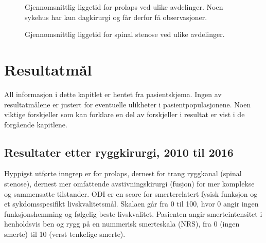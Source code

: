 \begin{figure}[h] 
\caption{Gjennomsnittlig liggetid for prolaps ved ulike avdelinger. Noen sykehus har kun dagkirurgi og får derfor få observasjoner. } 
\label{fig:LiggetidAvdPro}
\end{figure}

\begin{figure}[h] 
\caption{Gjennomsnittlig liggetid for spinal stenose ved ulike avdelinger.} 
\label{fig:LiggetidAvdSS}
\end{figure}






\clearpage

\section{Resultatmål}
All informasjon i dette kapitlet er hentet fra pasientskjema. Ingen av resultatmålene er justert
for eventuelle ulikheter i pasientpopulasjonene. Noen viktige forskjeller som kan forklare en del av forskjeller i resultat er vist i de forgående kapitlene.





\subsection{Resultater etter ryggkirurgi, 2010 til 2016}



Hyppigst utførte inngrep er for prolaps, dernest for trang ryggkanal (spinal stenose),
dernest mer omfattende avstivningskirurgi (fusjon) for mer komplekse og
sammensatte tilstander. 
ODI er en score for smerterelatert fysisk funksjon og et sykdomsspesifikt livskvalitetsmål. Skalaen går fra 0
til 100, hvor 0 angir ingen funksjonshemming og følgelig beste livskvalitet. Pasienten angir smerteintensitet i henholdsvis ben og rygg på en nummerisk smerteskala (NRS), fra 0 (ingen smerte) til 10 (verst tenkelige smerte).
 \\

